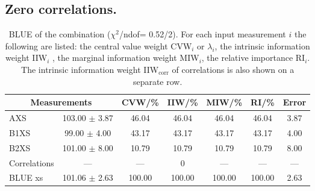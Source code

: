 \subsection{Zero correlations.}
\begin{table}[H]
\scriptsize
\begin{center}
\renewcommand{\arraystretch}{1.1}
\begin{tabular}{|lc|c|c|c|c|c|}
\hline
\multicolumn{2}{|c|}{Measurements} & CVW/\%  & IIW/\%  & MIW/\%  & RI/\%  & {\tiny Error}\\
\hline
AXS &     103.00 $\pm$       3.87 &      46.04 &      46.04 &      46.04 &      46.04 &       3.87\\
B1XS &      99.00 $\pm$       4.00 &      43.17 &      43.17 &      43.17 &      43.17 &       4.00\\
B2XS &     101.00 $\pm$       8.00 &      10.79 &      10.79 &      10.79 &      10.79 &       8.00\\
Correlations & --- & --- &  0 & --- & --- & ---\\
\hline
BLUE {\tiny xs} &     101.06 $\pm$       2.63 &     100.00 &     100.00 &     100.00 &     100.00 &       2.63\\
\hline
\end{tabular}
\caption{BLUE of the combination ($\chi^2$/ndof=      0.52/2).
 For each input measurement $i$ the following are listed: the central value weight CVW$_i$ or $\lambda_i$, the intrinsic information weight IIW$_i$ , the marginal information weight MIW$_i$, the relative importance RI$_i$. The intrinsic information weight IIW$_{\mathrm{corr}}$ of correlations is also shown on a separate row.}
\renewcommand{\arraystretch}{1}
\end{center}
\end{table}
